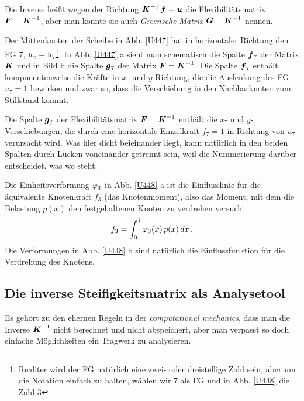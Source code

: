 {Die Inverse hei{\ss}t wegen der Richtung $\mbox{\boldmath $K$}^{-1}\,\mbox{\boldmath $f$} = \mbox{\boldmath $u$}$ die Flexibilit\"{a}tsmatrix $\mbox{\boldmath $F$} = \mbox{\boldmath $K$}^{-1}$, aber man k\"{o}nnte sie auch {\em Greensche Matrix\/} $\mbox{\boldmath $G$}= \mbox{\boldmath $K$}^{-1}$  nennen.

Der Mittenknoten der Scheibe in Abb. \ref{U447} hat in horizontaler Richtung den FG 7, $u_x = u_{7}$\footnote{Realiter wird der FG nat\"{u}rlich eine zwei- oder dreistellige Zahl sein, aber um die Notation einfach zu halten, w\"{a}hlen wir 7 als FG und in Abb. \ref{U448} die Zahl 3}. In Abb. \ref{U447} a sieht man schematisch die Spalte $\mbox{\boldmath $f$}_{7}$ der Matrix $\mbox{\boldmath $K$}$ und in Bild b die Spalte $\mbox{\boldmath $g$}_{7}$ der Matrix $\mbox{\boldmath $F$} = \mbox{\boldmath $K$}^{-1}$. Die Spalte $\mbox{\boldmath $f$}_{7}$ enth\"{a}lt komponentenweise die Kr\"{a}fte in $x$- und $y$-Richtung, die die Auslenkung des FG $u_{7} = 1$ bewirken und zwar so, dass die Verschiebung in den Nachbarknoten zum Stillstand kommt.

Die Spalte $\mbox{\boldmath $g$}_{7}$ der Flexibilit\"{a}tsmatrix $\mbox{\boldmath $F$} = \mbox{\boldmath $K$}^{-1}$ enth\"{a}lt die $x$- und $y$-Verschiebungen, die durch eine horizontale Einzelkraft $f_{7} = 1$ in Richtung von $u_{7}$ verursacht wird. Was hier dicht beieinander liegt, kann nat\"{u}rlich in den beiden Spalten durch L\"{u}cken voneinander getrennt sein, weil die Nummerierung dar\"{u}ber entscheidet, was wo steht.

Die Einheitsverformung $\varphi_3$ in Abb. \ref{U448} a ist die Einflusslinie f\"{u}r die \"{a}quivalente Knotenkraft $f_3$ (das Knotenmoment), also das Moment, mit dem die Belastung $p(x)$ den festgehaltenen Knoten zu verdrehen versucht
\begin{align}
f_3 = \int_0^{\,l} \varphi_3(x)\,p(x)\,dx\,.
\end{align}
Die Verformungen in Abb. \ref{U448} b sind nat\"{u}rlich die Einflussfunktion f\"{u}r die Verdrehung des Knotens.

{\textcolor{sectionTitleBlue}{\section{Die inverse Steifigkeitsmatrix als Analysetool}}}
Es geh\"{o}rt zu den ehernen Regeln in der {\em computational mechanics\/}, dass man die Inverse $\mbox{\boldmath $K$}^{-1}$ nicht berechnet und nicht abspeichert, aber man verpasst so doch einfache M\"{o}glichkeiten ein Tragwerk zu analysieren.

}
